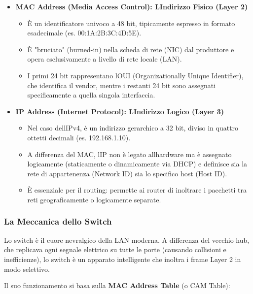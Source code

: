 \documentclass[11pt,a4paper]{article}
\begin{document}
\begin{itemize}
\item
  \textbf{MAC Address (Media Access Control):
  L\textquotesingle Indirizzo Fisico (Layer 2)}

  \begin{itemize}
  \item
    È un identificatore univoco a 48 bit, tipicamente espresso in
    formato esadecimale (es. 00:1A:2B:3C:4D:5E).
  \item
    È "bruciato" (burned-in) nella scheda di rete (NIC) dal produttore e
    opera esclusivamente a livello di rete locale (LAN).
  \item
    I primi 24 bit rappresentano l\textquotesingle OUI (Organizationally
    Unique Identifier), che identifica il vendor, mentre i restanti 24
    bit sono assegnati specificamente a quella singola interfaccia.
  \end{itemize}
\item
  \textbf{IP Address (Internet Protocol): L\textquotesingle Indirizzo
  Logico (Layer 3)}

  \begin{itemize}
  \item
    Nel caso dell\textquotesingle IPv4, è un indirizzo gerarchico a 32
    bit, diviso in quattro ottetti decimali (es. 192.168.1.10).
  \item
    A differenza del MAC, l\textquotesingle IP non è legato
    all\textquotesingle hardware ma è assegnato logicamente
    (staticamente o dinamicamente via DHCP) e definisce sia la rete di
    appartenenza (Network ID) sia lo specifico host (Host ID).
  \item
    È essenziale per il routing: permette ai router di inoltrare i
    pacchetti tra reti geograficamente o logicamente separate.
  \end{itemize}
\end{itemize}

\subsubsection{La Meccanica dello
Switch}\label{la-meccanica-dello-switch}

Lo switch è il cuore nevralgico della LAN moderna. A differenza del
vecchio hub, che replicava ogni segnale elettrico su tutte le porte
(causando collisioni e inefficienze), lo switch è un apparato
intelligente che inoltra i frame Layer 2 in modo selettivo.

Il suo funzionamento si basa sulla \textbf{MAC Address Table} (o CAM
Table):
\end{document}
